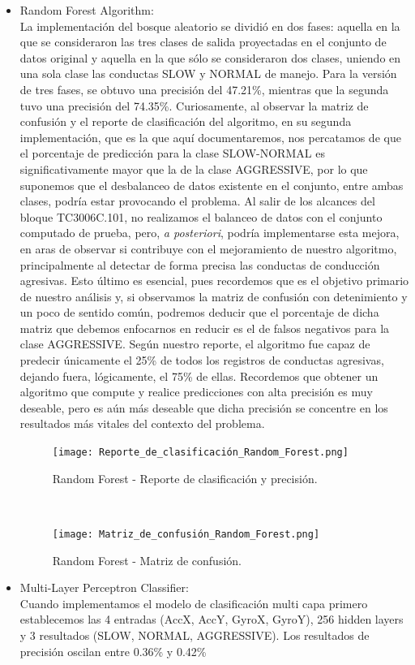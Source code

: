 \documentclass[spanish,12pt,letterpaper]{article}
\begin{document}
\begin{itemize}
    \item Random Forest Algorithm:\\
    La implementación del bosque aleatorio se dividió en dos fases: aquella en la que se consideraron las tres clases de salida proyectadas en el conjunto de datos original y aquella en la que sólo se consideraron dos clases, uniendo en una sola clase las conductas SLOW y NORMAL de manejo. Para la versión de tres fases, se obtuvo una precisión del 47.21\%, mientras que la segunda tuvo una precisión del 74.35\%. Curiosamente, al observar la matriz de confusión y el reporte de clasificación del algoritmo, en su segunda implementación, que es la que aquí documentaremos, nos percatamos de que el porcentaje de predicción para la clase SLOW-NORMAL es significativamente mayor que la de la clase AGGRESSIVE, por lo que suponemos que el desbalanceo de datos existente en el conjunto, entre ambas clases, podría estar provocando el problema. Al salir de los alcances del bloque TC3006C.101, no realizamos el balanceo de datos con el conjunto computado de prueba, pero, \textit{a posteriori}, podría implementarse esta mejora, en aras de observar si contribuye con el mejoramiento de nuestro algoritmo, principalmente al detectar de forma precisa las conductas de conducción agresivas. Esto último es esencial, pues recordemos que es el objetivo primario de nuestro análisis y, si observamos la matriz de confusión con detenimiento y un poco de sentido común, podremos deducir que el porcentaje de dicha matriz que debemos enfocarnos en reducir es el de falsos negativos para la clase AGGRESSIVE. Según nuestro reporte, el algoritmo fue capaz de predecir únicamente el 25\% de todos los registros de conductas agresivas, dejando fuera, lógicamente, el 75\% de ellas. Recordemos que obtener un algoritmo que compute y realice predicciones con alta precisión es muy deseable, pero es aún más deseable que dicha precisión se concentre en los resultados más vitales del contexto del problema.
    \\
    \begin{figure}[H]
        \centering
        \texttt{[image: Reporte\_de\_clasificación\_Random\_Forest.png]}
        \caption{Random Forest - Reporte de clasificación y precisión.}
        \label{fig:comand}%
    \end{figure}
    \\
    \begin{figure}[H]
        \centering
        \texttt{[image: Matriz\_de\_confusión\_Random\_Forest.png]}
        \caption{Random Forest - Matriz de confusión.}
        \label{fig:comand}%
    \end{figure}

    \item Multi-Layer Perceptron Classifier:\\
    Cuando implementamos el modelo de clasificación multi capa primero establecemos las 4 entradas (AccX, AccY, GyroX, GyroY), 256 hidden layers y 3 resultados (SLOW, NORMAL, AGGRESSIVE). Los resultados de precisión oscilan entre 0.36\% y 0.42\%    
    
\end{itemize}
\end{document}
